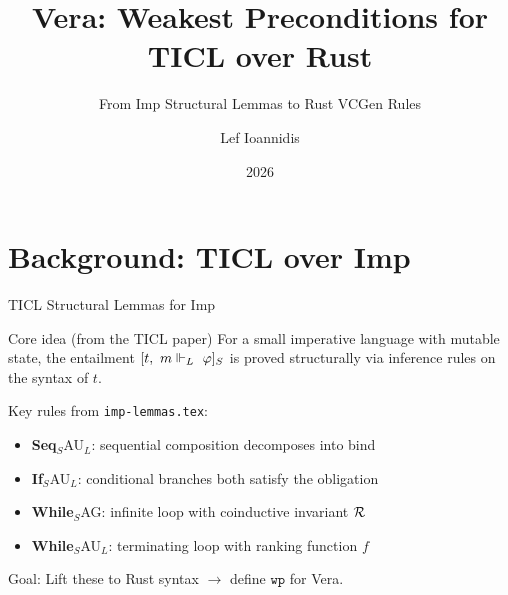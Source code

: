 \documentclass[aspectratio=169]{beamer}
\title{Vera: Weakest Preconditions for TICL over Rust}
\subtitle{From Imp Structural Lemmas to Rust VCGen Rules}
\author{Lef Ioannidis}
\date{2026}
\begin{document}
\begin{frame}
\titlepage
\end{frame}

\section{Background: TICL over Imp}

\begin{frame}{TICL Structural Lemmas for Imp}
  \begin{block}{Core idea (from the TICL paper)}
    For a small imperative language \stimp with mutable state,
    the entailment $\sentailsL{S}{t}{m}{\varphi}$ is proved
    structurally via inference rules on the syntax of $t$.
  \end{block}

  \vspace{0.3cm}
  Key rules from \texttt{imp-lemmas.tex}:
  \begin{itemize}
    \item \textbf{Seq}$_S$AU$_L$: sequential composition decomposes into bind
    \item \textbf{If}$_S$AU$_L$: conditional branches both satisfy the obligation
    \item \textbf{While}$_S$AG: infinite loop with coinductive invariant $\mathcal{R}$
    \item \textbf{While}$_S$AU$_L$: terminating loop with ranking function $f$
  \end{itemize}

  \vspace{0.3cm}
  \alert{Goal:} Lift these to Rust syntax $\to$ define $\mathtt{wp}$ for Vera.
\end{frame}
\end{document}
